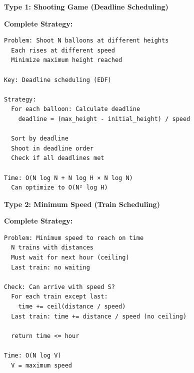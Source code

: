 \documentclass[11pt,a4paper,oneside]{book}
\begin{document}
\begin{tcolorbox}[
    enhanced,breakable,
    colback=infobox!10,
    colframe=infobox,
    boxrule=2pt,
    arc=4mm,
    title=\textbf{Complete Complex Scheduling Algorithms}
]
\textbf{Type 1: Shooting Game (Deadline Scheduling)}

\textbf{Complete Strategy:}
\begin{verbatim}
Problem: Shoot N balloons at different heights
  Each rises at different speed
  Minimize maximum height reached

Key: Deadline scheduling (EDF)

Strategy:
  For each balloon: Calculate deadline
    deadline = (max_height - initial_height) / speed
  
  Sort by deadline
  Shoot in deadline order
  Check if all deadlines met

Time: O(N log N + N log H × N log N)
  Can optimize to O(N² log H)
\end{verbatim}

\textbf{Type 2: Minimum Speed (Train Scheduling)}

\textbf{Complete Strategy:}
\begin{verbatim}
Problem: Minimum speed to reach on time
  N trains with distances
  Must wait for next hour (ceiling)
  Last train: no waiting

Check: Can arrive with speed S?
  For each train except last:
    time += ceil(distance / speed)
  Last train: time += distance / speed (no ceiling)
  
  return time <= hour

Time: O(N log V)
  V = maximum speed
\end{verbatim}
\end{tcolorbox}
\end{document}
